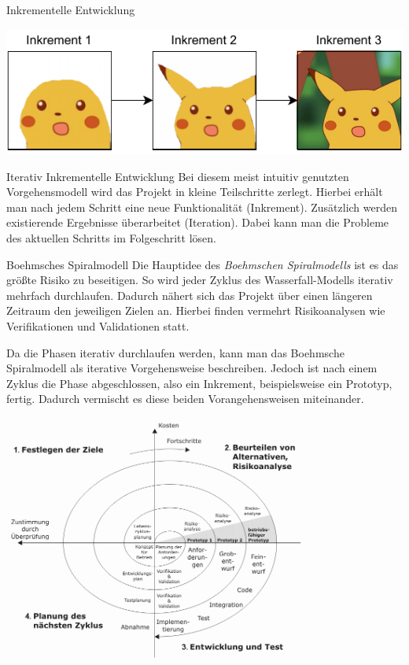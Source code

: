 \begin{example}{Inkrementelle Entwicklung}
    \begin{center}
        \includegraphics{includes/figures/example_incremental_development.pdf}
    \end{center}
\end{example}

\begin{defi}{Iterativ Inkrementelle Entwicklung}
    Bei diesem meist intuitiv genutzten Vorgehensmodell wird das Projekt in kleine Teilschritte zerlegt.
    Hierbei erhält man nach jedem Schritt eine neue Funktionalität (Inkrement).
    Zusätzlich werden existierende Ergebnisse überarbeitet (Iteration).
    Dabei kann man die Probleme des aktuellen Schritts im Folgeschritt lösen.
\end{defi}

\begin{bonus}{Boehmsches Spiralmodell}
    Die Hauptidee des \emph{Boehmschen Spiralmodells} ist es das größte Risiko zu beseitigen.
    So wird jeder Zyklus des Wasserfall-Modells iterativ mehrfach durchlaufen.
    Dadurch nähert sich das Projekt über einen längeren Zeitraum den jeweiligen Zielen an.
    Hierbei finden vermehrt Risikoanalysen wie Verifikationen und Validationen statt.

    Da die Phasen iterativ durchlaufen werden, kann man das Boehmsche Spiralmodell als iterative Vorgehensweise beschreiben.
    Jedoch ist nach einem Zyklus die Phase abgeschlossen, also ein Inkrement, beispielsweise ein Prototyp, fertig.
    Dadurch vermischt es diese beiden Vorangehensweisen miteinander.

    \begin{center}
        \includegraphics[width=0.75\textwidth]{includes/figures/bonus_boehmsches_spiralmodell.png}
    \end{center}
\end{bonus}

